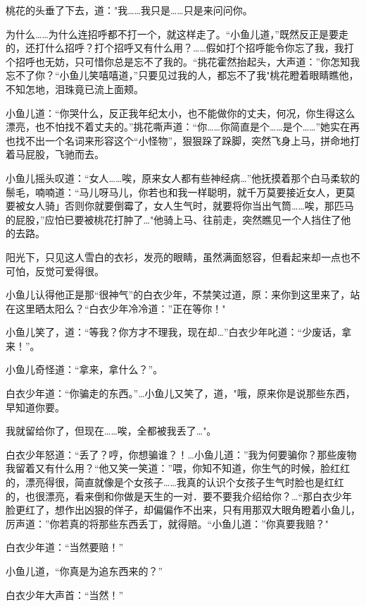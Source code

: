 \documentclass[12pt,oneside]{book}
\begin{document}
桃花的头垂了下去，道："我\ldots\ldots 我只是\ldots\ldots 只是来问问你。

为什么\ldots\ldots 为什么连招呼都不打一个，就这样走了。``小鱼儿道，''既然反正是要走的，还打什么招呼？打个招呼又有什么用？\ldots\ldots 假如打个招呼能令你忘了我，我打个招呼也无妨，只可惜你总是忘不了我的。``挑花霍然抬起头，大声道：''你怎知我忘不了你？``小鱼儿笑嘻嘻道，''只要见过我的人，都忘不了我"桃花瞪着眼睛瞧他，不知怎地，泪珠竟已流上面颊。

小鱼儿道：``你哭什么，反正我年纪太小，也不能做你的丈夫，何况，你生得这么漂亮，也不怕找不着丈夫的。''挑花嘶声道：``你\ldots\ldots 你简直是个\ldots\ldots 是个\ldots\ldots{}''她实在再也找不出一个名词来形容这个``小怪物''，狠狠跺了跺脚，突然飞身上马，拼命地打着马屁股，飞驰而去。

小鱼儿摇头叹道：``女人\ldots\ldots 唉，原来女人都有些神经病\ldots{}''他抚摸着那个白马柔软的鬃毛，喃喃道：``马儿呀马儿，你若也和我一样聪明，就千万莫要接近女人，更莫要被女人骑」否则你就要倒霉了，女人生气时，就要将你当出气筒\ldots\ldots 唉，那匹马的屁股，''应怕已要被桃花打肿了\ldots"他骑上马、往前走，突然瞧见一个人挡住了他的去路。

阳光下，只见这人雪白的衣衫，发亮的眼睛，虽然满面怒容，但看起来却一点也不可怕，反觉可爱得很。

小鱼儿认得他正是那``很神气''的白衣少年，不禁笑过道，原：来你到这里来了，站在这里晒太阳么？``白衣少年冷冷道：''正在等你！"

小鱼儿笑了，道：``等我？你方才不理我，现在却\ldots{}''白衣少年叱道：``少废话，拿来！''。

小鱼儿奇怪道：``拿来，拿什么？''。

白衣少年道：``你骗走的东西。''\ldots 小鱼儿又笑了，道，"哦，原来你是说那些东西，早知道你要。

我就留给你了，但现在\ldots\ldots 唉，全都被我丢了\ldots"。

白衣少年怒道：``丢了？哼，你想骗谁？！\ldots 小鱼儿道：''我为何要骗你？那些废物我留着又有什么用？``他又笑一笑道：''喂，你知不知道，你生气的时候，脸红红的，漂亮得很，简直就像是个女孩子\ldots\ldots 我真的认识个女孩子生气时脸也是红红的，也很漂亮，看来倒和你做是天生的一对．要不要我介绍给你？\ldots{}``那白衣少年脸更红了，想作出凶狠的佯子，却偏偏作不出来，只有用那双大眼角瞪着小鱼儿，厉声道：''你若真的将那些东西丢丁，就得赔。``小鱼儿道：''你真要我赔？"

白衣少年道：``当然要赔！''

小鱼儿道，``你真是为追东西来的？''

白衣少年大声首：``当然！''
\end{document}
